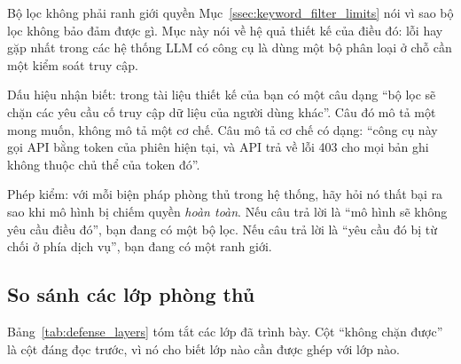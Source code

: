 \begin{pitfall}{Bộ lọc không phải ranh giới quyền}
Mục~\ref{ssec:keyword_filter_limits} nói vì sao bộ lọc không bảo đảm được gì. Mục này nói về hệ quả thiết kế của điều đó: lỗi hay gặp nhất trong các hệ thống LLM có công cụ là dùng một bộ phân loại ở chỗ cần một kiểm soát truy cập.

Dấu hiệu nhận biết: trong tài liệu thiết kế của bạn có một câu dạng ``bộ lọc sẽ chặn các yêu cầu cố truy cập dữ liệu của người dùng khác''. Câu đó mô tả một mong muốn, không mô tả một cơ chế. Câu mô tả cơ chế có dạng: ``công cụ này gọi API bằng token của phiên hiện tại, và API trả về lỗi 403 cho mọi bản ghi không thuộc chủ thể của token đó''.

Phép kiểm: với mỗi biện pháp phòng thủ trong hệ thống, hãy hỏi nó thất bại ra sao khi mô hình bị chiếm quyền \emph{hoàn toàn}. Nếu câu trả lời là ``mô hình sẽ không yêu cầu điều đó'', bạn đang có một bộ lọc. Nếu câu trả lời là ``yêu cầu đó bị từ chối ở phía dịch vụ'', bạn đang có một ranh giới.
\end{pitfall}

\subsection{So sánh các lớp phòng thủ}
\label{ssec:defense_comparison}

Bảng~\ref{tab:defense_layers} tóm tắt các lớp đã trình bày. Cột ``không chặn được'' là cột đáng đọc trước, vì nó cho biết lớp nào cần được ghép với lớp nào.

